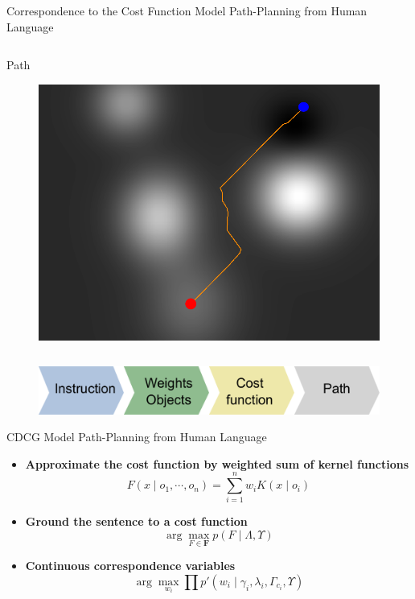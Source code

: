 \begin{frame}{Correspondence to the Cost Function}{ Model Path-Planning from Human Language }
\begin{columns}
\begin{block}{Path}
\begin{figure}
	\centering
	\includegraphics[width=.9\linewidth]{figure/costmap_path}
\end{figure}
\end{block}
\end{columns}

\begin{figure}
	\centering
	\includegraphics[width=.9\linewidth]{figure/cost_func_inference}
\end{figure}

\end{frame}

\begin{frame}{CDCG}{ Model Path-Planning from Human Language }

	\begin{itemize}
	\item {\bf Approximate the cost function by weighted sum of kernel functions}
	\begin{equation}
	\nonumber
	F( x \mid o_1 , \cdots , o_n ) = \sum_{i=1}^{n} w_i K( x \mid o_i )
	\end{equation}
	\item {\bf Ground the sentence to a cost function}
	\begin{equation}
	\nonumber
	\arg \max_{ F \in \bm{F} } p( F \mid \Lambda , \Upsilon )
	\end{equation}
	\item {\bf Continuous correspondence variables}
	\begin{equation}
	\nonumber
	\arg \max_{ w_i } \prod p'( w_i \mid \gamma_i , \lambda_i, \Gamma_{c_i} , \Upsilon )
	\end{equation}	
	\end{itemize}

\end{frame}

